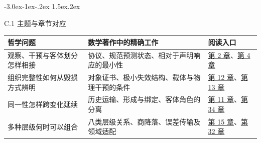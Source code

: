 \documentclass[
  11pt,
  oneside]{book}
\makeatletter
\newcounter{none} %
\renewcommand\section{\@startsection{section}{1}{\z@}%
  {-3.0ex\@plus-1ex\@minus-.2ex}%
  {1.5ex\@plus.2ex}%
  {\normalfont\Large\bfseries\raggedright\hyphenpenalty=10000\exhyphenpenalty=10000}}
\makeatother
\begin{document}
\par\ifdim\dimexpr\pagegoal-\pagetotal\relax<12\baselineskip\newpage\fi

\section{C.1 主题与章节对应}\label{ph-c-1}

{\def\LTcaptype{none} %
\begin{longtable}[]{@{}
  >{\raggedright\arraybackslash}p{}
  >{\raggedright\arraybackslash}p{}
  >{\raggedright\arraybackslash}p{}@{}}
\toprule\noalign{}
\begin{minipage}[b]{\linewidth}\raggedright
哲学问题
\end{minipage} & \begin{minipage}[b]{\linewidth}\raggedright
数学著作中的精确工作
\end{minipage} & \begin{minipage}[b]{\linewidth}\raggedright
阅读入口
\end{minipage} \\
\midrule\noalign{}
\endhead
\bottomrule\noalign{}
\endlastfoot
观察、干预与客体划分怎样相接 & 协议、规范预测状态、相对于声明响应的最小性 & \href{https://github.com/MurphyHoops/UEOT/blob/3d443ec29eb17af1fc00699a74e2d42d73516d81/mathematics/UEOT_MATHEMATICS.md\#ch-2}{第 2 章}、\href{https://github.com/MurphyHoops/UEOT/blob/3d443ec29eb17af1fc00699a74e2d42d73516d81/mathematics/UEOT_MATHEMATICS.md\#ch-4}{第 4 章} \\
组织完整性如何从毁损方式辨明 & 对象证书、极小失效结构、载体与物理干预的条件 & \href{https://github.com/MurphyHoops/UEOT/blob/3d443ec29eb17af1fc00699a74e2d42d73516d81/mathematics/UEOT_MATHEMATICS.md\#ch-12}{第 12 章}、\href{https://github.com/MurphyHoops/UEOT/blob/3d443ec29eb17af1fc00699a74e2d42d73516d81/mathematics/UEOT_MATHEMATICS.md\#ch-13}{第 13 章} \\
同一性怎样跨变化延续 & 历史运输、形成与绑定、客体角色的分离 & \href{https://github.com/MurphyHoops/UEOT/blob/3d443ec29eb17af1fc00699a74e2d42d73516d81/mathematics/UEOT_MATHEMATICS.md\#ch-11}{第 11 章}、\href{https://github.com/MurphyHoops/UEOT/blob/3d443ec29eb17af1fc00699a74e2d42d73516d81/mathematics/UEOT_MATHEMATICS.md\#ch-34}{第 34 章} \\
多种层级何时可以组合 & 八类层级关系、商降落、误差传输及领域适配 & \href{https://github.com/MurphyHoops/UEOT/blob/3d443ec29eb17af1fc00699a74e2d42d73516d81/mathematics/UEOT_MATHEMATICS.md\#ch-15}{第 15 章}、\href{https://github.com/MurphyHoops/UEOT/blob/3d443ec29eb17af1fc00699a74e2d42d73516d81/mathematics/UEOT_MATHEMATICS.md\#ch-32}{第 32 章} \\

\end{longtable}}
\end{document}
